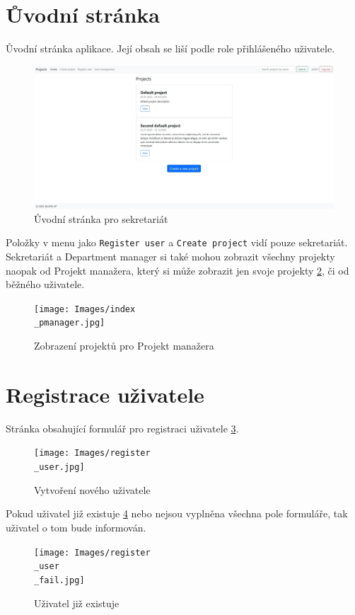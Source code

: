\documentclass[czech,P5]{thesiskiv}
\begin{document}
\section{Ůvodní stránka}
Ůvodní stránka aplikace. Její obsah se liší podle role přihlášeného uživatele.
\begin{figure}[H]
	\centering
	\includegraphics[width=\textwidth]{Images/index.jpg}
	\caption{Ůvodní stránka pro sekretariát}
	\label{fig:index} 
\end{figure}
Položky v menu jako \texttt{Register user} a \texttt{Create project} vidí pouze sekretariát. Sekretariát a Department manager si také mohou zobrazit všechny projekty naopak od Projekt manažera, který si může zobrazit jen svoje projekty \ref{fig:indexpmanager}, či od běžného uživatele.
\begin{figure}[H]
	\centering
	\texttt{[image: Images/index\\\_pmanager.jpg]}
	\caption{Zobrazení projektů pro Projekt manažera}
	\label{fig:indexpmanager} 
\end{figure}

\section{Registrace uživatele}
Stránka obsahující formulář pro registraci uživatele \ref{fig:reg}.
\begin{figure}[H]
	\centering
	\texttt{[image: Images/register\\\_user.jpg]}
	\caption{Vytvoření nového uživatele}
	\label{fig:reg} 
\end{figure}
\newpage
 Pokud uživatel již existuje \ref{fig:regfail} nebo nejsou vyplněna všechna pole formuláře, tak uživatel o tom bude informován.
 \begin{figure}[H]
	\centering
	\texttt{[image: Images/register\\\_user\\\_fail.jpg]}
	\caption{Uživatel již existuje}
	\label{fig:regfail} 
\end{figure}
\newpage
\end{document}
